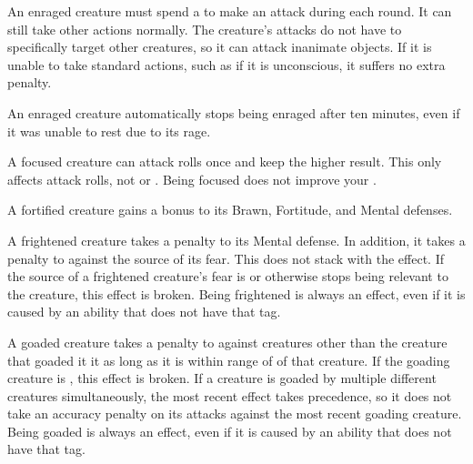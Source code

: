    An enraged creature must spend a  to make an attack during each round.
  It can still take other actions normally.
  The creature's attacks do not have to specifically target other creatures, so it can attack inanimate objects.
  If it is unable to take standard actions, such as if it is unconscious, it suffers no extra penalty.

  An enraged creature automatically stops being enraged after ten minutes, even if it was unable to rest due to its rage.

   A focused creature can  attack rolls once and keep the higher result.
  This only affects attack rolls, not  or .
  Being focused does not improve your .

   A fortified creature gains a  bonus to its Brawn, Fortitude, and Mental defenses.

   A frightened creature takes a  penalty to its Mental defense.
  In addition, it takes a  penalty to  against the source of its fear.
  This does not stack with the \panicked effect.
  If the source of a frightened creature's fear is  or otherwise stops being relevant to the creature, this effect is broken.
  Being frightened is always an  effect, even if it is caused by an ability that does not have that tag.

   A goaded creature takes a  penalty to  against creatures other than the creature that goaded it it as long as it is within \rngmed range of of that creature.
  If the goading creature is , this effect is broken.
  If a creature is goaded by multiple different creatures simultaneously, the most recent effect takes precedence, so it does not take an accuracy penalty on its attacks against the most recent goading creature.
  Being goaded is always an  effect, even if it is caused by an ability that does not have that tag.

